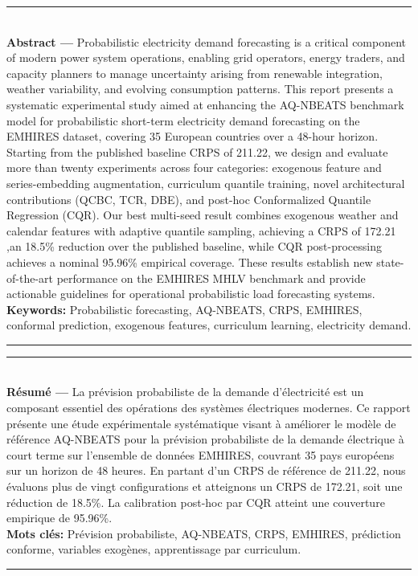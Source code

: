 \thispagestyle{empty}

\noindent\rule[2pt]{\textwidth}{0.5pt}\\
{\textbf{Abstract ---}}
Probabilistic electricity demand forecasting is a critical component of modern
power system operations, enabling grid operators, energy traders, and capacity
planners to manage uncertainty arising from renewable integration, weather
variability, and evolving consumption patterns. This report presents a
systematic experimental study aimed at enhancing the AQ-NBEATS benchmark
model for probabilistic short-term electricity demand forecasting on the EMHIRES
dataset, covering 35 European countries over a 48-hour horizon. Starting from
the published baseline CRPS of 211.22, we design and evaluate more than twenty
experiments across four categories: exogenous feature and series-embedding
augmentation, curriculum quantile training, novel architectural contributions
(QCBC, TCR, DBE), and post-hoc Conformalized Quantile Regression (CQR).
Our best multi-seed result combines exogenous weather and calendar features
with adaptive quantile sampling, achieving a CRPS of 172.21 ,an 18.5\%
reduction over the published baseline, while CQR post-processing achieves
a nominal 95.96\% empirical coverage. These results establish new
state-of-the-art performance on the EMHIRES MHLV benchmark and provide
actionable guidelines for operational probabilistic load forecasting systems.\\
{\textbf{Keywords:}} Probabilistic forecasting, AQ-NBEATS, CRPS, EMHIRES,
conformal prediction, exogenous features, curriculum learning, electricity demand.\\
\noindent\rule[2pt]{\textwidth}{0.5pt}

\vspace{1.5cm}

\noindent\rule[2pt]{\textwidth}{0.5pt}\\
{\textbf{R\'esum\'e ---}}
La pr\'evision probabiliste de la demande d'\'electricit\'e est un composant
essentiel des op\'erations des syst\`emes \'electriques modernes. Ce rapport
pr\'esente une \'etude exp\'erimentale syst\'ematique visant \`a am\'eliorer
le mod\`ele de r\'ef\'erence AQ-NBEATS pour la pr\'evision probabiliste
de la demande \'electrique \`a court terme sur l'ensemble de donn\'ees EMHIRES,
couvrant 35 pays europ\'eens sur un horizon de 48 heures. En partant d'un CRPS
de r\'ef\'erence de 211.22, nous \'evaluons plus de vingt configurations
et atteignons un CRPS de 172.21, soit une r\'eduction de 18.5\%. La
calibration post-hoc par CQR atteint une couverture empirique de 95.96\%.\\
{\textbf{Mots cl\'es:}} Pr\'evision probabiliste, AQ-NBEATS, CRPS, EMHIRES,
pr\'ediction conforme, variables exog\`enes, apprentissage par curriculum.\\
\noindent\rule[2pt]{\textwidth}{0.5pt}
